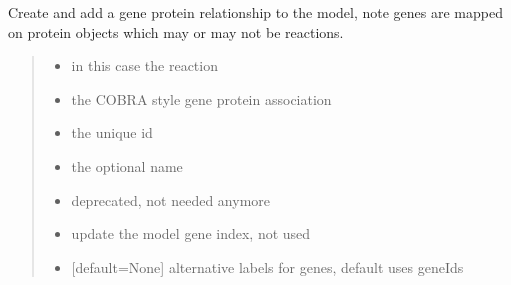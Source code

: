 \documentclass[letterpaper,12pt,english]{sphinxmanual}
\begin{document}
\begin{fulllineitems}
\begin{fulllineitems}
\label{\detokenize{api/core:cbmpy.CBModel.Model.createGeneProteinAssociation}}
\pysigstartsignatures
\pysiglinewithargsret
{}
{\sphinxparamcomma {}\sphinxparamcomma {}\sphinxparamcomma {}\sphinxparamcomma {}\sphinxparamcomma {}\sphinxparamcomma {}}
{}
\pysigstopsignatures
\sphinxAtStartPar
Create and add a gene protein relationship to the model, note genes are mapped on protein objects which may or may not be reactions.
\begin{quote}\begin{description}
\begin{itemize}
\item {} 
\sphinxAtStartPar
{} \textendash{} in this case the reaction

\item {} 
\sphinxAtStartPar
{} \textendash{} the COBRA style gene protein association

\item {} 
\sphinxAtStartPar
{} \textendash{} the unique id

\item {} 
\sphinxAtStartPar
{} \textendash{} the optional name

\item {} 
\sphinxAtStartPar
{} \textendash{} deprecated, not needed anymore

\item {} 
\sphinxAtStartPar
{} \textendash{} update the model gene index, not used

\item {} 
\sphinxAtStartPar
{} \textendash{} {[}default=None{]} alternative labels for genes, default uses geneIds


\end{itemize}
\end{description}
\end{quote}
\end{fulllineitems}
\end{fulllineitems}
\end{document}
